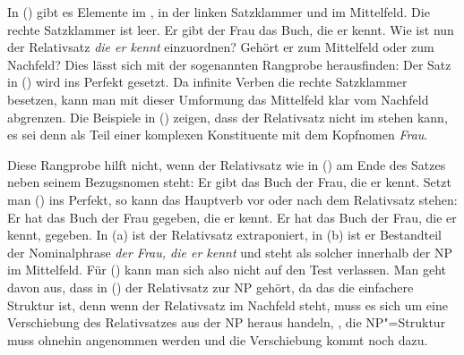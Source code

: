 In () gibt es Elemente im \vf, in der linken Satzklammer
und im Mittelfeld. Die rechte Satzklammer ist leer.
\ea
Er gibt der Frau das Buch, die er kennt.
\z
Wie ist nun der Relativsatz \emph{die er kennt} einzuordnen? Gehört
er zum Mittelfeld oder zum Nachfeld?
Dies lässt sich mit der sogenannten Rangprobe \citep[]{Bech55a} herausfinden:
Der Satz in () wird ins Perfekt gesetzt. Da infinite Verben
die rechte Satzklammer besetzen, kann man mit dieser Umformung das Mittelfeld
klar vom Nachfeld abgrenzen. Die Beispiele in () zeigen,
dass der Relativsatz nicht im \mf stehen kann, es sei denn als Teil
einer komplexen Konstituente mit dem Kopfnomen \emph{Frau}.
\eal
{}
\zl

\noindent
Diese Rangprobe hilft nicht, wenn der Relativsatz wie in () am Ende des Satzes neben seinem Bezugsnomen steht:
\ea
Er gibt das Buch der Frau, die er kennt.
\z
Setzt man () ins Perfekt, so kann das Hauptverb vor oder nach dem Relativsatz stehen:
\eal
\ex Er hat das Buch der Frau gegeben, die er kennt.
\ex Er hat das Buch der Frau, die er kennt, gegeben.
\zl
In (a) ist der Relativsatz extraponiert, in (b) ist er Bestandteil der Nominalphrase
\emph{der Frau, die er kennt} und steht als solcher innerhalb der NP im Mittelfeld. Für () kann man sich also
nicht auf den Test verlassen. Man geht davon aus, dass in () der Relativsatz zur NP gehört,
da das die einfachere Struktur ist, denn wenn der Relativsatz im Nachfeld steht, muss es sich um eine
Verschiebung des Relativsatzes aus der NP heraus handeln, \dash, die NP"=Struktur muss ohnehin
angenommen werden und die Verschiebung kommt noch dazu.



